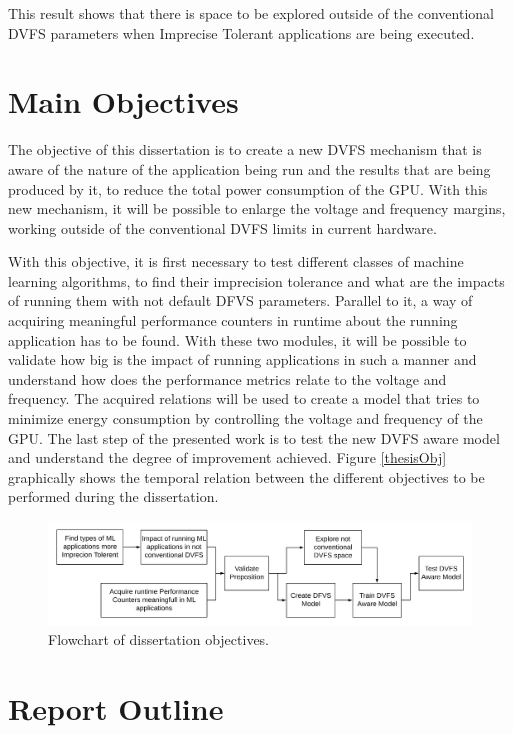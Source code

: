 This result shows that there is space to be explored outside of the conventional DVFS parameters when Imprecise Tolerant applications are being executed.


\section{Main Objectives}
\label{section:objectives}

The objective of this dissertation is to create a new DVFS mechanism that is aware of the nature of the application being run and the results that are being produced by it, to reduce the total power consumption of the GPU. With this new mechanism, it will be possible to enlarge the voltage and frequency margins, working outside of the conventional DVFS limits in current hardware. 

With this objective, it is first necessary to test different classes of machine learning algorithms, to find their imprecision tolerance and what are the impacts of running them with not default DFVS parameters. Parallel to it, a way of acquiring meaningful performance counters in runtime about the running application has to be found. With these two modules, it will be possible to validate how big is the impact of running applications in such a manner and understand how does the performance metrics relate to the voltage and frequency. The acquired relations will be used to create a model that tries to minimize energy consumption by controlling the voltage and frequency of the GPU. The last step of the presented work is to test the new DVFS aware model and understand the degree of improvement achieved. Figure \ref{thesisObj} graphically shows the temporal relation between the different objectives to be performed during the dissertation.

\begin{figure}[!htb]
  \centering
  \includegraphics[width=1\textwidth]{Figures/Introduction/Dissertation_Objectives.png}
  \caption[]{Flowchart of dissertation objectives.}
  \label{fig:thesisObj}
\end{figure}

\section{Report Outline}